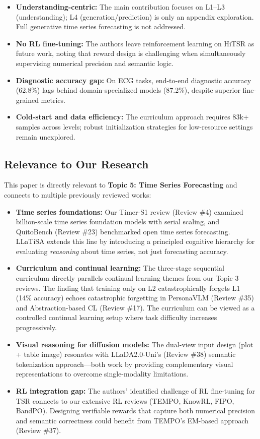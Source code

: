 \documentclass[11pt]{article}
\begin{document}
\begin{itemize}
    \item \textbf{Understanding-centric:} The main contribution focuses on L1--L3 (understanding); L4 (generation/prediction) is only an appendix exploration. Full generative time series forecasting is not addressed.
    \item \textbf{No RL fine-tuning:} The authors leave reinforcement learning on HiTSR as future work, noting that reward design is challenging when simultaneously supervising numerical precision and semantic logic.
    \item \textbf{Diagnostic accuracy gap:} On ECG tasks, end-to-end diagnostic accuracy (62.8\%) lags behind domain-specialized models (87.2\%), despite superior fine-grained metrics.
    \item \textbf{Cold-start and data efficiency:} The curriculum approach requires 83k+ samples across levels; robust initialization strategies for low-resource settings remain unexplored.
\end{itemize}

\subsection{Relevance to Our Research}

This paper is directly relevant to \textbf{Topic 5: Time Series Forecasting} and connects to multiple previously reviewed works:

\begin{itemize}
    \item \textbf{Time series foundations:} Our Timer-S1 review (Review \#4) examined billion-scale time series foundation models with serial scaling, and QuitoBench (Review \#23) benchmarked open time series forecasting. LLaTiSA extends this line by introducing a principled cognitive hierarchy for evaluating \emph{reasoning} about time series, not just forecasting accuracy.
    \item \textbf{Curriculum and continual learning:} The three-stage sequential curriculum directly parallels continual learning themes from our Topic 3 reviews. The finding that training only on L2 catastrophically forgets L1 (14\% accuracy) echoes catastrophic forgetting in PersonaVLM (Review \#35) and Abstraction-based CL (Review \#17). The curriculum can be viewed as a controlled continual learning setup where task difficulty increases progressively.
    \item \textbf{Visual reasoning for diffusion models:} The dual-view input design (plot + table image) resonates with LLaDA2.0-Uni's (Review \#38) semantic tokenization approach---both work by providing complementary visual representations to overcome single-modality limitations.
    \item \textbf{RL integration gap:} The authors' identified challenge of RL fine-tuning for TSR connects to our extensive RL reviews (TEMPO, KnowRL, FIPO, BandPO). Designing verifiable rewards that capture both numerical precision and semantic correctness could benefit from TEMPO's EM-based approach (Review \#37).
\end{itemize}
\end{document}
